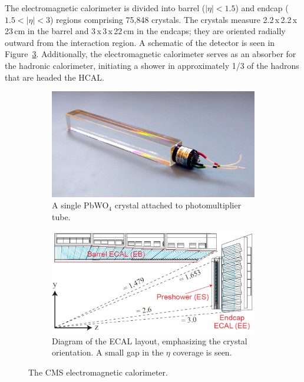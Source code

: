 The electromagnetic calorimeter is divided into barrel ($|\eta|<1.5$) and endcap ($1.5<|\eta|<3$) regions comprising 75,848 crystals. The crystals measure 2.2$\,$x$\,$2.2$\,$x$\,$23$\,$cm in the barrel and 3$\,$x$\,$3$\,$x$\,$22$\,$cm in the endcaps; they are oriented radially outward from the interaction region. A schematic of the detector is seen in Figure~\ref{fig:ecal}. Additionally, the electromagnetic calorimeter serves as an absorber for the hadronic calorimeter, initiating a shower in approximately 1/3 of the hadrons that are headed the HCAL.

\begin{figure}
\centering
\begin{subfigure}[c]{0.35\textwidth}
\includegraphics[width=\textwidth]{figs/ecalcrystal.jpg}
\caption{A single PbWO$_{4}$ crystal attached to photomultiplier tube.}
\label{fig:ecalcrystal}
\end{subfigure}
\begin{subfigure}[c]{0.625\textwidth}
\includegraphics[width=\textwidth]{figs/ecal.png}
\caption{Diagram of the ECAL layout, emphasizing the crystal orientation. A small gap in the $\eta$ coverage is seen.}
\label{fig:ecal}
\end{subfigure}
\caption{The CMS electromagnetic calorimeter.}
\end{figure}

